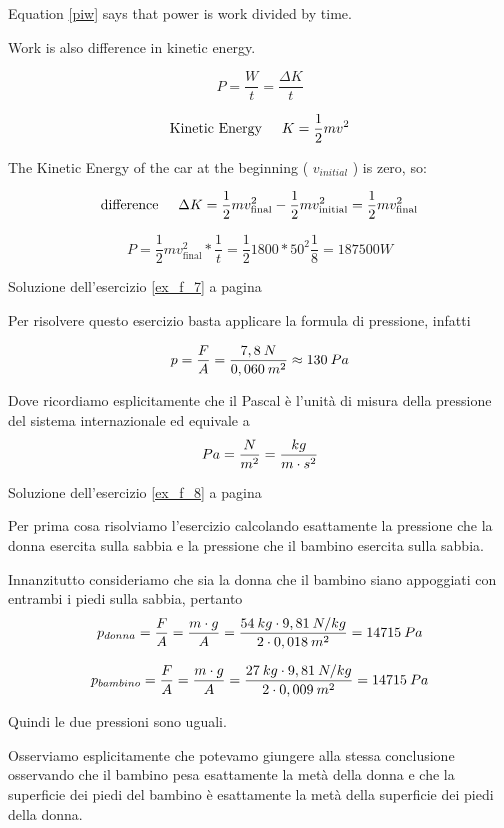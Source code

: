 Equation \ref{piw} says that power is work divided by time.

Work is also difference in kinetic energy.

\begin{equation}
P=\frac{W}{t}=\frac{\Delta K}{t}
\end{equation}

\begin{equation}
\textrm{Kinetic Energy\hspace{0.5cm}} K=\frac{1}{2}mv^2
\end{equation}

The Kinetic Energy of the car at the beginning ( $v_{initial}$ ) is zero, so:

\begin{equation}
\textrm{difference\hspace{0.5cm}}\Delta K=\frac{1}{2}mv_\textrm{final}^2-\frac{1}{2}mv_\textrm{initial}^2=\frac{1}{2}mv_\textrm{final}^2
\end{equation}

\begin{equation}
P=\frac{1}{2}mv_\textrm{final}^2*\frac{1}{t}=
\frac{1}{2}1800*50^2\frac{1}{8}=187500 W
\end{equation}



Soluzione dell'esercizio \ref{ex_f_7} a pagina \pageref{ex_f_7}\label{sol_f_7}

Per risolvere questo esercizio basta applicare la formula di pressione, infatti

\[p={F\over A}={7,8\: N\over 0,060\: m^2}\approx 130\: Pa\]

Dove ricordiamo esplicitamente che il Pascal è l’unità di misura della pressione del sistema internazionale ed equivale a \[Pa={N\over m^2}={kg\over m\cdot s^2}\]


Soluzione dell'esercizio \ref{ex_f_8} a pagina \pageref{ex_f_8}\label{sol_f_8}

Per prima cosa risolviamo l’esercizio calcolando esattamente la pressione che la donna esercita sulla sabbia e la pressione che il bambino esercita sulla sabbia. 

Innanzitutto consideriamo che sia la donna che il bambino siano appoggiati con entrambi i piedi sulla sabbia, pertanto
\[p_{donna}={F\over A}={m\cdot g\over A}={54\: kg\cdot 9,81\: N/kg\over 2\cdot 0,018\: m^2}=14715\: Pa\]

\[p_{bambino}={F\over A}={m\cdot g\over A}={27\: kg\cdot 9,81\: N/kg\over 2\cdot 0,009\: m^2}=14715\: Pa\]


Quindi le due pressioni sono uguali.

Osserviamo esplicitamente che potevamo giungere alla stessa conclusione osservando che il bambino pesa esattamente la metà della donna e che la superficie dei piedi del bambino è esattamente la metà della superficie dei piedi della donna.



